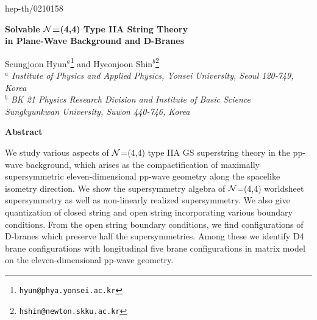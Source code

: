 \documentclass[a4paper,12pt]{article}
\begin{document}
\renewcommand{\thefootnote}{\fnsymbol{footnote}}

\begin{titlepage}
\hfill{hep-th/0210158}
\vspace{15mm}
\baselineskip 8mm

\begin{center}
{\LARGE \bf Solvable ${\cal N}$=(4,4) Type IIA String Theory \\ 
in Plane-Wave Background and D-Branes}
\end{center}
\baselineskip 6mm
\vspace{10mm}
\begin{center}
Seungjoon Hyun$^a$\footnote{\tt hyun@phya.yonsei.ac.kr}
and
Hyeonjoon Shin$^b$\footnote{\tt hshin@newton.skku.ac.kr} \\[5mm]
{\it
$^a$ Institute of Physics and Applied Physics, Yonsei University,
Seoul 120-749, Korea \\
$^b$ BK 21 Physics Research Division and Institute of Basic Science \\
Sungkyunkwan University, Suwon 440-746, Korea}
\end{center}

\thispagestyle{empty}


\vfill

\begin{center}
{\bf Abstract}
\end{center}
\noindent 
We study various aspects of ${\cal N}$=(4,4) type IIA GS superstring theory
in the pp-wave background, which arises as the compactification of maximally
supersymmetric eleven-dimensional pp-wave geometry along the spacelike
isometry direction. We show the supersymmetry algebra of ${\cal N}$=(4,4)
worldsheet supersymmetry as well as non-linearly realized supersymmetry.
We also give quantization of closed string and open string incorporating 
various boundary conditions. From the open string boundary conditions, we
find configurations of D-branes which preserve half the supersymmetries. 
Among these we identify D4 brane configurations with longitudinal five brane
configurations in matrix model on the eleven-dimensional pp-wave geometry. 


\vspace{20mm}
\end{titlepage}
\end{document}
